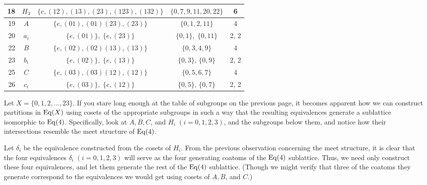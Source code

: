 {\begin{center}
\begin{tabular}{|r|c|c|c|c|}
\hline
18&$H_3$ & $\{e, (12), (13), (23), (123), (132)\}$ & $\{0, 7, 9, 11, 20, 22\}$& 6\\[4pt]
\hline
19&$A$ & $\{e, (01),(01)(23),(23) \}$ & $\{0, 1, 2, 11\}$& 4 \\[4pt]
\hline
20&$a_i$ & $\{e, (01)\}, \; \{e, (23) \}$ & $\{0, 1\}, \;\{0, 11\}$& 2, 2 \\[4pt]
\hline
22&$B$ & $\{e, (02), (02)(13),(13)\}$ & $\{0, 3, 4, 9\}$& 4 \\[4pt]
\hline
23&$b_i$ & $\{e, (02)\}, \; \{e, (13)\}$ & $\{0, 3\}, \, \{0, 9\}$& 2, 2 \\[4pt]
\hline
25&$C$ & $\{e, (03), (03)(12), (12)\}$ & $\{0, 5, 6, 7\}$& 4 \\[4pt]
\hline
26&$c_i$ & $\{e, (03)\}, \; \{e, (12)\}$ & $\{0, 5\}, \, \{0, 7\}$& 2, 2 \\[4pt]
\hline
\end{tabular}
\end{center}
}

Let $X = \{0, 1, 2, \ldots, 23\}$.  
If you stare long enough at the table of subgroups on the previous page, it becomes apparent
how we can construct partitions in $\operatorname{Eq}(X)$ using cosets of the appropriate subgroups
in such a way that the resulting equivalences generate a sublattice isomorphic to
$\operatorname{Eq}(4)$. Specifically, look at $A, B, C$, and $H_i \; (i=0,1,2,3)$, and the
subgroups below them, and notice how their intersections resemble the meet 
structure of $\operatorname{Eq}(4)$.  

Let $\delta_i$ be the equivalence constructed from the cosets of $H_i$.  From the
previous observation concerning the meet structure, it is clear that the
four equivalences $\delta_i \; (i=0,1,2,3)$ will serve as the four generating
coatoms of the $\operatorname{Eq}(4)$ sublattice.  Thus, we need only construct these four
equivalences, and let them generate the rest of the $\operatorname{Eq}(4)$ sublattice.
(Though we might verify that three of the coatoms they generate correspond to
the equivalences we would get using cosets of $A, B$, and $C$.)

